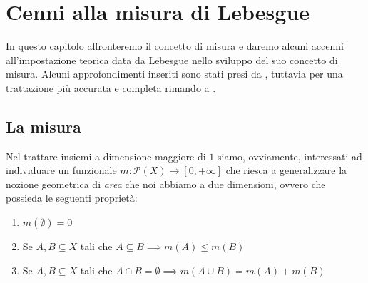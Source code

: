 \chapter{Cenni alla misura di Lebesgue}

In questo capitolo affronteremo il concetto di misura e daremo alcuni accenni all'impostazione teorica data da Lebesgue nello sviluppo
del suo concetto di misura. Alcuni approfondimenti inseriti sono stati presi da \cite{rudin}, tuttavia per una trattazione più accurata e completa rimando a \cite{measure_theory}.

\section{La misura}
Nel trattare insiemi a dimensione maggiore di $1$ siamo, ovviamente, interessati ad individuare un funzionale $m: \mathcal{P}(X) \to [0; +\infty]$ che riesca a generalizzare la nozione geometrica di \emph{area} che noi abbiamo a due dimensioni, ovvero che possieda le seguenti proprietà:
\begin{enumerate}[label=\protect\circled{\arabic*}]
	\item $m(\emptyset) = 0$
	\item Se $A, B \subseteq X$ tali che $A \subseteq B \implies m(A) \leq m(B)$
	\item Se $A, B \subseteq X$ tali che $A \cap B = \emptyset \implies m(A \cup B) = m(A) + m(B)$
\end{enumerate}